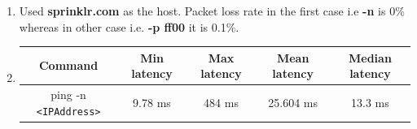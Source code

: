 \documentclass[a4paper,11pt]{article}
\begin{document}
\begin{enumerate}[itemsep=-3pt,label=(\alph*)]
	\item Used \textcolor[RGB]{23,0,229}{\textbf{sprinklr.com}} as the host. Packet loss rate in the first case i.e \textbf{-n} is 0\% whereas in other case i.e. \textbf{-p ff00} it is 0.1\%.
	\\ \vspace{-3.5mm}
	\item \begin{tabular}{|c|c|c|c|c|}
		\hline
		\rowcolor[RGB]{0, 145, 255}
		\hspace{1.5mm}\textbf{Command}\hspace{1.5mm}&\hspace{1.5mm}\textbf{Min latency}\hspace{1.5mm} & \hspace{1.5mm}\textbf{Max latency}\hspace{1.5mm} & \hspace{1.5mm}\textbf{Mean latency}\hspace{1.5mm} &\hspace{1.5mm} \textbf{Median latency}\hspace{1.5mm} \\
		\hline
		\rowcolor[RGB]{230, 242, 255}
		ping -n \verb|<IPAddress>| &9.78 ms & 484 ms & 25.604 ms &13.3 ms
		\\ \hline
		
		

\end{tabular}
\end{enumerate}
\end{document}
